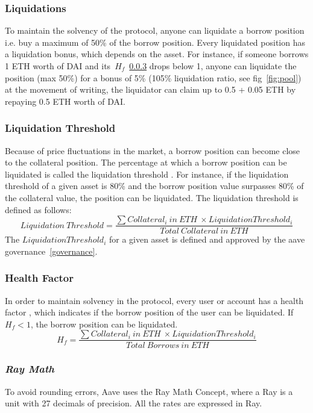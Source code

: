 \documentclass[11pt,a4paper]{report}
\begin{document}
\subsubsection{Liquidations}\cite{aaveV1}\cite{liquidation} 
To maintain the solvency of the protocol, anyone can liquidate a borrow position i.e. buy a maximum of 50\% of the borrow position. Every liquidated position has a liquidation bonus, which depends on the asset. For instance, if someone borrows 1 ETH worth of DAI and its~$H_{f}$~\ref{hf} drops below 1, anyone can liquidate the position (max 50\%) for a bonus of 5\% (105\% liquidation ratio, see fig~\ref{fig:pool}) at the movement of writing, the liquidator can claim up to 0.5 + 0.05 ETH by repaying 0.5 ETH worth of DAI.
\subsubsection{Liquidation Threshold}\label{liquidation}
Because of price fluctuations in the market, a borrow position can become close to the collateral position. The percentage at which a borrow position can be liquidated is called the liquidation threshold\cite{aaveV1}\cite{risk} . For instance, if the liquidation threshold of a given asset is 80\% and the borrow position value surpasses 80\% of the collateral value, the position can be liquidated. The liquidation threshold is defined as follows:
\[ Liquidation~Threshold = \frac{\sum Collateral_{i}~in~ETH~\times Liquidation Threshold_{i}}{Total~Collateral~in~ETH} \]
The $Liquidation Threshold_{i}$ for a given asset is defined and approved by the aave governance~\ref{governance}.
\subsubsection{Health Factor}\label{hf}
In order to maintain solvency in the protocol, every user or account has a health factor\cite{aaveV1}\cite{risk} , which indicates if the borrow position of the user can be liquidated. If~$H_{f} < 1$, the borrow position can be liquidated.
\[ H_{f} = \frac{\sum Collateral_{i}~in~ETH~\times Liquidation Threshold_{i}}{Total~Borrows~in~ETH} \]

\subsubsection{\textit{Ray Math}}\label{ray}
To avoid rounding errors, Aave uses the Ray Math Concept\cite{ray}\cite{ray2}, where a Ray is a unit with 27 decimals of precision. All the rates are expressed in Ray.
\end{document}
